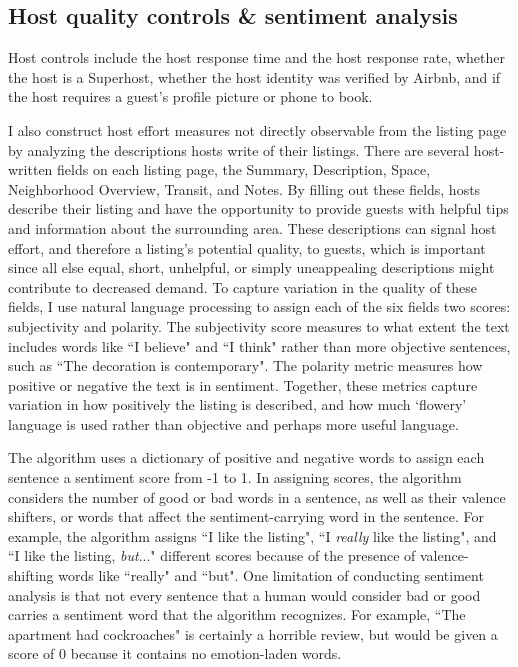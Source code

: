 \subsection*{Host quality controls  \& sentiment analysis}
Host controls include the host response time and the host response rate, whether the host is a Superhost, whether the host identity was verified by Airbnb, and if the host requires a guest's profile picture or phone to book. 

I also construct host effort measures not directly observable from the listing page by analyzing the descriptions hosts write of their listings. There are several host-written fields on each listing page, the Summary, Description, Space, Neighborhood Overview, Transit, and Notes. By filling out these fields, hosts describe their listing and have the opportunity to provide guests with helpful tips and information about the surrounding area. These descriptions can signal host effort, and therefore a listing's potential quality, to guests, which is important since all else equal, short, unhelpful, or simply uneappealing descriptions might contribute to decreased demand. To capture variation in the quality of these fields, I use natural language processing to assign each of the six fields two scores: subjectivity and polarity. The subjectivity score measures to what extent the text includes words like ``I believe" and ``I think" rather than more objective sentences, such as ``The decoration is contemporary". The polarity metric measures how positive or negative the text is in sentiment. Together, these metrics capture variation in how positively the listing is described, and how much `flowery' language is used rather than objective and perhaps more useful language.

The algorithm uses a dictionary of positive and negative words to assign each sentence a sentiment score from -1 to 1. In assigning scores, the algorithm considers the number of good or bad words in a sentence, as well as their valence shifters, or words that affect the sentiment-carrying word in the sentence. For example, the algorithm assigns ``I like the listing", ``I \textit{really} like the listing", and ``I like the listing, \textit{but}..." different scores because of the presence of valence-shifting words like ``really" and ``but". One limitation of conducting sentiment analysis is that not every sentence that a human would consider bad or good carries a sentiment word that the algorithm recognizes. For example, ``The apartment had cockroaches" is certainly a horrible review, but would be given a score of 0 because it contains no emotion-laden words. 

